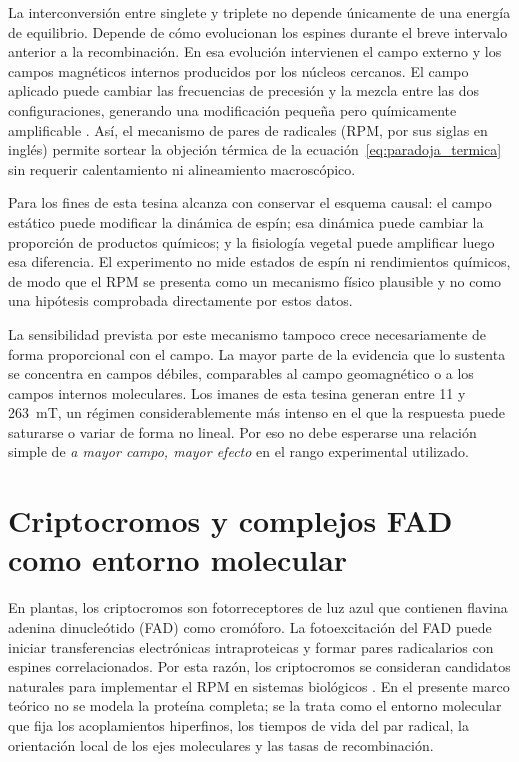 La interconversión entre singlete y triplete no depende únicamente de una energía de equilibrio. Depende de cómo evolucionan los espines durante el breve intervalo anterior a la recombinación. En esa evolución intervienen el campo externo y los campos magnéticos internos producidos por los núcleos cercanos. El campo aplicado puede cambiar las frecuencias de precesión y la mezcla entre las dos configuraciones, generando una modificación pequeña pero químicamente amplificable \cite{maffei_2022,radhakrishnan_2019}. Así, el mecanismo de pares de radicales (RPM, por sus siglas en inglés) permite sortear la objeción térmica de la ecuación~\eqref{eq:paradoja_termica} sin requerir calentamiento ni alineamiento macroscópico.

Para los fines de esta tesina alcanza con conservar el esquema causal: el campo estático puede modificar la dinámica de espín; esa dinámica puede cambiar la proporción de productos químicos; y la fisiología vegetal puede amplificar luego esa diferencia. El experimento no mide estados de espín ni rendimientos químicos, de modo que el RPM se presenta como un mecanismo físico plausible y no como una hipótesis comprobada directamente por estos datos.

La sensibilidad prevista por este mecanismo tampoco crece necesariamente de forma proporcional con el campo. La mayor parte de la evidencia que lo sustenta se concentra en campos débiles, comparables al campo geomagnético o a los campos internos moleculares. Los imanes de esta tesina generan entre 11 y 263~mT, un régimen considerablemente más intenso en el que la respuesta puede saturarse o variar de forma no lineal. Por eso no debe esperarse una relación simple de \textit{a mayor campo, mayor efecto} en el rango experimental utilizado.

\section{Criptocromos y complejos FAD como entorno molecular}

En plantas, los criptocromos son fotorreceptores de luz azul que contienen flavina adenina dinucleótido (FAD) como cromóforo. La fotoexcitación del FAD puede iniciar transferencias electrónicas intraproteicas y formar pares radicalarios con espines correlacionados. Por esta razón, los criptocromos se consideran candidatos naturales para implementar el RPM en sistemas biológicos \cite{maffei_2022,saletnik_2022_static,araujo_2016}. En el presente marco teórico no se modela la proteína completa; se la trata como el entorno molecular que fija los acoplamientos hiperfinos, los tiempos de vida del par radical, la orientación local de los ejes moleculares y las tasas de recombinación.

